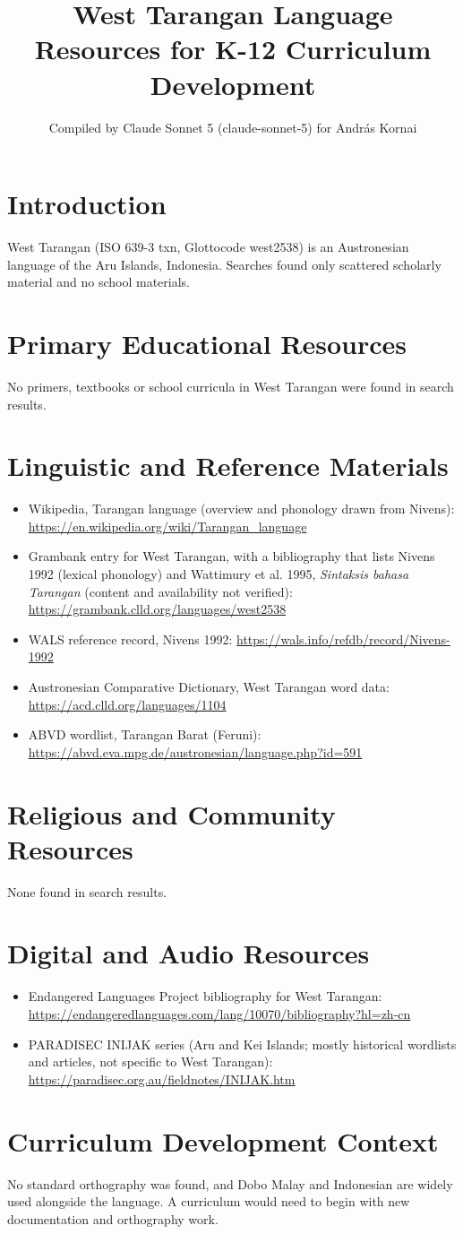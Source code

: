 \documentclass[12pt]{article}
\title{West Tarangan Language Resources for K-12 Curriculum Development}
\author{Compiled by Claude Sonnet 5 (claude-sonnet-5) for Andr\'as Kornai}
\date{}
\begin{document}
\maketitle
\section{Introduction}
West Tarangan (ISO 639-3 txn, Glottocode west2538) is an Austronesian language of the Aru Islands, Indonesia. Searches found only scattered scholarly material and no school materials.
\section{Primary Educational Resources}
No primers, textbooks or school curricula in West Tarangan were found in search results.
\section{Linguistic and Reference Materials}
\begin{itemize}
\item Wikipedia, Tarangan language (overview and phonology drawn from Nivens): \url{https://en.wikipedia.org/wiki/Tarangan_language}
\item Grambank entry for West Tarangan, with a bibliography that lists Nivens 1992 (lexical phonology) and Wattimury et al. 1995, \emph{Sintaksis bahasa Tarangan} (content and availability not verified): \url{https://grambank.clld.org/languages/west2538}
\item WALS reference record, Nivens 1992: \url{https://wals.info/refdb/record/Nivens-1992}
\item Austronesian Comparative Dictionary, West Tarangan word data: \url{https://acd.clld.org/languages/1104}
\item ABVD wordlist, Tarangan Barat (Feruni): \url{https://abvd.eva.mpg.de/austronesian/language.php?id=591}
\end{itemize}
\section{Religious and Community Resources}
None found in search results.
\section{Digital and Audio Resources}
\begin{itemize}
\item Endangered Languages Project bibliography for West Tarangan: \url{https://endangeredlanguages.com/lang/10070/bibliography?hl=zh-cn}
\item PARADISEC INIJAK series (Aru and Kei Islands; mostly historical wordlists and articles, not specific to West Tarangan): \url{https://paradisec.org.au/fieldnotes/INIJAK.htm}
\end{itemize}
\section{Curriculum Development Context}
No standard orthography was found, and Dobo Malay and Indonesian are widely used alongside the language. A curriculum would need to begin with new documentation and orthography work.
\end{document}

